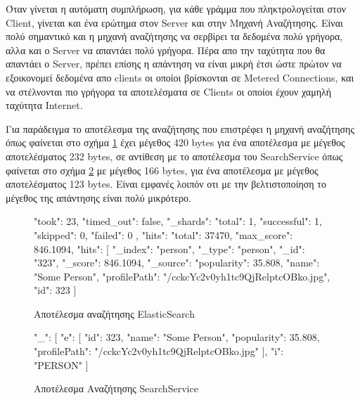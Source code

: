 Όταν γίνεται η αυτόματη συμπλήρωση, για κάθε γράμμα που πληκτρολογείται στον Client, γίνεται και ένα ερώτημα στον Server και στην Μηχανή Αναζήτησης. Είναι πολύ σημαντικό και η μηχανή αναζήτησης να σερβίρει τα δεδομένα πολύ γρήγορα, αλλα και ο Server να απαντάει πολύ γρήγορα. Πέρα απο την ταχύτητα που θα απαντάει ο Server, πρέπει επίσης η απάντηση να είναι μικρή έτσι ώστε πρώτον να εξοικονομεί δεδομένα απο clients οι οποίοι βρίσκονται σε Metered Connections, και να στέλνονται πιο γρήγορα τα αποτελέσματα σε Clients οι οποίοι έχουν χαμηλή ταχύτητα Internet.

Για παράδειγμα το αποτέλεσμα της αναζήτησης που επιστρέφει η μηχανή αναζήτησης όπως φαίνεται στο σχήμα \ref{result:es} έχει μέγεθος 420 bytes για ένα αποτέλεσμα με μέγεθος αποτελέσματος 232 bytes, σε αντίθεση με το αποτέλεσμα του SearchService όπως φαίνεται στο σχήμα \ref{result:ss} με μέγεθος 166 bytes, για ένα αποτέλεσμα με μέγεθος αποτελέσματος 123 bytes. Είναι εμφανές λοιπόν οτι με την βελτιστοποίηση το μέγεθος της απάντησης είναι πολύ μικρότερο.

\begin{figure}[H]
    \begin{jsoncode}
{
    "took": 23,
    "timed_out": false,
    "_shards": {
        "total": 1,
        "successful": 1,
        "skipped": 0,
        "failed": 0
    },
    "hits": {
        "total": 37470,
        "max_score": 846.1094,
        "hits": [{
            "_index": "person",
            "_type": "person",
            "_id": "323",
            "_score": 846.1094,
            "_source": {
                "popularity": 35.808,
                "name": "Some Person",
                "profilePath": "/cckcYc2v0yh1tc9QjRelptcOBko.jpg",
                "id": 323
            }
        }]
    }
}
    \end{jsoncode}
    \caption{Αποτέλεσμα αναζήτησης ElasticSearch}
   \label{result:es}
\end{figure}
\begin{figure}[H]
    \begin{jsoncode}
{
    "_": [{
        "e": [{
            "id": 323,
            "name": "Some Person",
            "popularity": 35.808,
            "profilePath": "/cckcYc2v0yh1tc9QjRelptcOBko.jpg"
        }],
        "i": "PERSON"
    }]
}
    \end{jsoncode}
    \caption{Αποτέλεσμα Αναζήτησης SearchService}
   \label{result:ss}
\end{figure}
